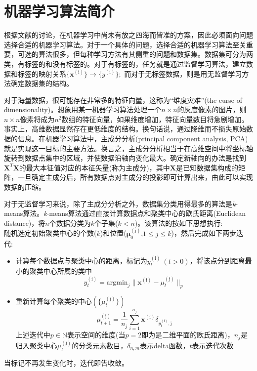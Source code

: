 \section{机器学习算法简介}
根据文献的讨论，在机器学习中尚未有放之四海而皆准的方案，因此必须面向问题选择合适的机器学习算法。对于一个具体的问题，选择合适的机器学习算法至关重要，可选的算法很多，但每种学习方法有其侧重的问题和数据集。数据集可分为两类，有标签的和没有标签的。对于有标签的，任务就是通过监督学习算法，建立数据和标签的映射关系$\{\mathbf{x}^{(\mathrm{i})}\}\rightarrow\{y^{(\mathrm{i})}\}$;~而对于无标签数据，则是用无监督学习方法确定数据集的结构。

对于海量数据，很可能存在非常多的特征向量，这称为“维度灾难”\textrm{(the curse of dimensionality)}。想象用某一机器学习算法处理一个$n\times n$的灰度像素的图片，则$n\times n$像素将成为$n^2$数组的特征向量，如果维度增加，特征向量数目将急剧增加。事实上，高维数据显然存在更低维度的结构。换句话说，通过降维而不损失原始数据的信息。在机器学习算法中，主成分分析(\textrm{principal component analysis, PCA})就是实现这一目标的主要方法\cite{OJS6-701_2016}。换言之，主成分分析相当于在高维空间中将坐标轴旋转到数据点集中的区域，并使数据沿轴向变化最大。确定新轴向的办法是找到$\mathbf{X}^T\mathbf{X}$的最大本征值对应的本征矢量(称为主成分)，其中$\mathbf{X}$是已知数据集构成的矩阵，一旦确定主成分后，所有数据点对主成分的投影即可计算出来，由此可以实现数据的压缩。

对于无监督学习来说，除了主成分分析之外，数据集分类用得最多的算法是\textit{k}-\textrm{means}算法\cite{EJHPS4-2_2008}。\textit{k}-\textrm{means}算法通过直接计算数据点和聚类中心的欧氏距离\textrm{(Euclidean distance)}，将$n$个数据分类为$k$个子集($k<n$)。该算法的按如下思想执行:\\
随机选定初始聚类中心的个数($k$)和位置($\mathbf{\mu}_0^{(\mathrm{j})}$,$1\leqslant j \leqslant k$)，然后完成如下两步迭代:~
\begin{itemize}
	\item 计算每个数据点与聚类中心的距离，标记为$y_t^{\mathrm{(i)}}~(t>0)$，将该点分到距离最小的聚类中心所属的类中
		\begin{displaymath}
			y_t^{(\mathrm{i})}=\textrm{argmin}_j\|\mathbf{x}^{(\mathrm{i})}-\mu_t^{(\mathrm{j})}\|_p
		\end{displaymath}
	\item 重新计算每个聚类的中心$(\{\mu_t^{(\mathrm{j})}\})$
		\begin{displaymath}
			\mu_{t+1}^{(\mathrm{j})}=\dfrac1{n_j}\sum_{i=1}^{n_j}\mathbf{x}^{(\mathrm{i})}\delta_{y_t^{(\mathrm{i})},\mathrm{j}}
		\end{displaymath}
		上述迭代中$p\in\mathbb{N}$表示空间的维度(当$p=2$即为是二维平面的欧氏距离)，$n_j$是归入聚类中心$\mu_t^{(\mathrm{j})}$的分类元素数目，$\delta_{n,m}$表示\textrm{delta}函数，$t$表示迭代次数
\end{itemize}
当标记不再发生变化时，迭代即告收敛。

